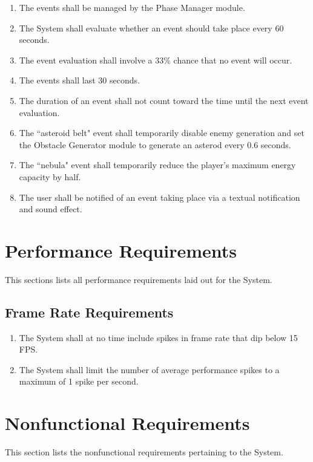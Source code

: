 \documentclass[12pt]{report}
\newenvironment{reqlist}{
	\renewcommand{\labelenumi}{\tab\thesubsection.\arabic{enumi}}
	\renewcommand{\labelenumii}{\thesubsection.\arabic{enumi}.\arabic{enumii}}
	\begin{enumerate}[itemsep = 1pt, parsep = 0pt, leftmargin = *]
}{\end{enumerate}}
\begin{document}
\begin{reqlist}
			\begin{reqlist}
				\item The events shall be managed by the Phase Manager module.
				\item The System shall evaluate whether an event should take place every 60 seconds.
				\item The event evaluation shall involve a 33\% chance that no event will occur.
				\item The events shall last 30 seconds.
				\item The duration of an event shall not count toward the time until the next event evaluation.
				\item The ``asteroid belt" event shall temporarily disable enemy generation and set the Obstacle Generator module to generate an asterod every 0.6 seconds.
				\item The ``nebula" event shall temporarily reduce the player's maximum energy capacity by half.
				\item The user shall be notified of an event taking place via a textual notification and sound effect.
			\end{reqlist}
		\end{reqlist}


\section{Performance Requirements}
	This sections lists all performance requirements laid out for the System.
	\subsection{Frame Rate Requirements}
	\begin{reqlist}
		\item The System shall at no time include spikes in frame rate that dip below 15 FPS.
		\item The System shall limit the number of average performance spikes to a maximum of 1 spike per second.
	\end{reqlist}

\section{Nonfunctional Requirements}
	This section lists the nonfunctional requirements pertaining to the System. 
\end{document}
